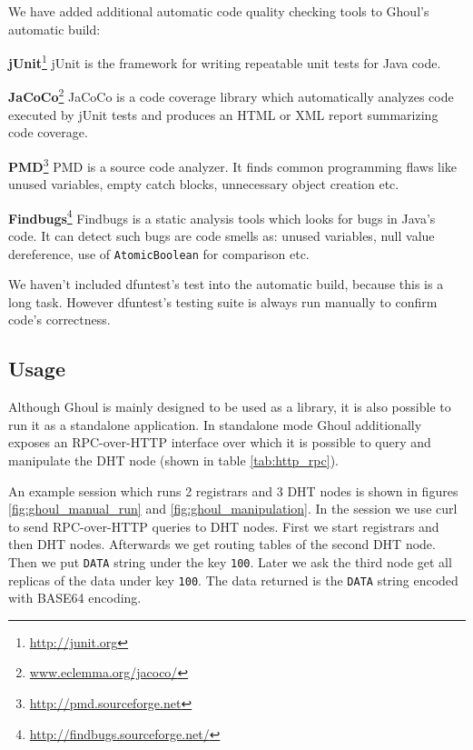 We have added additional automatic code quality checking tools to Ghoul's automatic build:

\begin{description}
  \item{\textbf{jUnit}\footnote{\url{http://junit.org}}} 
    jUnit is the framework for writing repeatable unit tests for Java code.
  \item{\textbf{JaCoCo}\footnote{\url{www.eclemma.org/jacoco/}}}
    JaCoCo is a code coverage library which automatically analyzes code executed by jUnit tests and produces an HTML or XML report summarizing code coverage.

  \item{\textbf{PMD}\footnote{\url{http://pmd.sourceforge.net}}}
    PMD is a source code analyzer.
    It finds common programming flaws like unused variables, empty catch blocks, unnecessary object creation etc.
  \item{\textbf{Findbugs}\footnote{\url{http://findbugs.sourceforge.net/}}}
    Findbugs is a static analysis tools which looks for bugs in Java's code.
    It can detect such bugs are code smells as: unused variables, null value dereference, use of \texttt{AtomicBoolean} for comparison etc.
    
\end{description}

We haven't included dfuntest's test into the automatic build, because this is a long task.
However dfuntest's testing suite is always run manually to confirm code's correctness.

\subsection{Usage}

Although Ghoul is mainly designed to be used as a library, it is also possible to run it as a standalone application.
In standalone mode Ghoul additionally exposes an RPC-over-HTTP interface over which it is possible to query and manipulate the DHT node (shown in table \ref{tab:http_rpc}).

An example session which runs 2 registrars and 3 DHT nodes is shown in figures 
\ref{fig:ghoul_manual_run} and \ref{fig:ghoul_manipulation}.
In the session we use curl to send RPC-over-HTTP queries to DHT nodes.
First we start registrars and then DHT nodes.
Afterwards we get routing tables of the second DHT node.
Then we put \texttt{DATA} string under the key \texttt{100}.
Later we ask the third node get all replicas of the data under key \texttt{100}.
The data returned is the \texttt{DATA} string encoded with BASE64 encoding.

